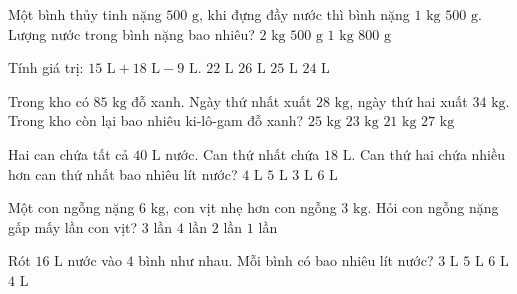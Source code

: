 \begin{ex} %
Một bình thủy tinh nặng $500\text{ g}$, khi đựng đầy nước thì bình nặng $1\text{ kg } 500\text{ g}$. Lượng nước trong bình nặng bao nhiêu?
\choice
{$2\text{ kg}$}
{$500\text{ g}$}
{\True $1\text{ kg}$}
{$800\text{ g}$}
\end{ex}

\begin{ex} %
Tính giá trị: $15\text{ L} + 18\text{ L} - 9\text{ L}$.
\choice
{$22\text{ L}$}
{$26\text{ L}$}
{$25\text{ L}$}
{\True $24\text{ L}$}
\end{ex}

\begin{ex} %
Trong kho có $85\text{ kg}$ đỗ xanh. Ngày thứ nhất xuất $28\text{ kg}$, ngày thứ hai xuất $34\text{ kg}$. Trong kho còn lại bao nhiêu ki-lô-gam đỗ xanh?
\choice
{$25\text{ kg}$}
{\True $23\text{ kg}$}
{$21\text{ kg}$}
{$27\text{ kg}$}
\end{ex}

\begin{ex} %
Hai can chứa tất cả $40\text{ L}$ nước. Can thứ nhất chứa $18\text{ L}$. Can thứ hai chứa nhiều hơn can thứ nhất bao nhiêu lít nước?
\choice
{\True $4\text{ L}$}
{$5\text{ L}$}
{$3\text{ L}$}
{$6\text{ L}$}
\end{ex}

\begin{ex} %
Một con ngỗng nặng $6\text{ kg}$, con vịt nhẹ hơn con ngỗng $3\text{ kg}$. Hỏi con ngỗng nặng gấp mấy lần con vịt?
\choice
{$3$ lần}
{$4$ lần}
{\True $2$ lần}
{$1$ lần}
\end{ex}

\begin{ex} %
Rót $16\text{ L}$ nước vào $4$ bình như nhau. Mỗi bình có bao nhiêu lít nước?
\choice
{$3\text{ L}$}
{$5\text{ L}$}
{$6\text{ L}$}
{\True $4\text{ L}$}
\end{ex}

